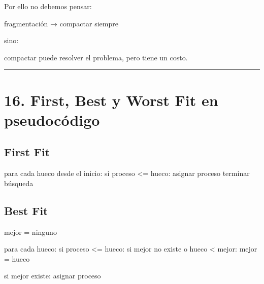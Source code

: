 \documentclass[
  spanish,
  letterpaper,
]{scrbook}
\newenvironment{Shaded}{\begin{snugshade}}{\end{snugshade}}
\newcommand{\NormalTok}[1]{\textcolor[rgb]{0.00,0.23,0.31}{#1}}
\begin{document}
Por ello no debemos pensar:

\begin{Shaded}
\begin{Highlighting}[]
\NormalTok{fragmentación → compactar siempre}
\end{Highlighting}
\end{Shaded}

sino:

\begin{Shaded}
\begin{Highlighting}[]
\NormalTok{compactar puede resolver el problema,}
\NormalTok{pero tiene un costo.}
\end{Highlighting}
\end{Shaded}

\begin{center}\rule{0.5\linewidth}{0.5pt}\end{center}


\chapter{16. First, Best y Worst Fit en
pseudocódigo}\label{first-best-y-worst-fit-en-pseudocuxf3digo}

\section{First Fit}\label{first-fit-2}

\begin{Shaded}
\begin{Highlighting}[]
\NormalTok{para cada hueco desde el inicio:}
\NormalTok{    si proceso \textless{}= hueco:}
\NormalTok{        asignar proceso}
\NormalTok{        terminar búsqueda}
\end{Highlighting}
\end{Shaded}

\section{Best Fit}\label{best-fit-2}

\begin{Shaded}
\begin{Highlighting}[]
\NormalTok{mejor = ninguno}

\NormalTok{para cada hueco:}
\NormalTok{    si proceso \textless{}= hueco:}
\NormalTok{        si mejor no existe}
\NormalTok{           o hueco \textless{} mejor:}
\NormalTok{            mejor = hueco}

\NormalTok{si mejor existe:}
\NormalTok{    asignar proceso}
\end{Highlighting}
\end{Shaded}
\end{document}
